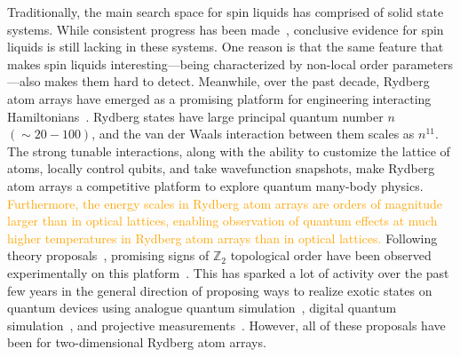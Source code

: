 \documentclass[twocolumn,superscriptaddress,amsmath,amssymb,aps,prx,nofootinbib]{revtex4-2}
\newcommand{\addtext}[1]{\textcolor{orange}{#1}}
\begin{document}
Traditionally, the main search space for spin liquids has comprised of solid state systems. While consistent progress has been made~\cite{savary2017,knolle2019field}, conclusive evidence for spin liquids is still lacking in these systems. One reason is that the same feature that makes spin liquids interesting---being characterized by non-local order parameters---also makes them hard to detect. Meanwhile, over the past decade, Rydberg atom arrays have emerged as a promising platform for engineering interacting Hamiltonians~\cite{weimer2010rydberg,ebadi2021quantum,wu2021concise,saffman2010,lukin2001,labuhn2016,jaksch2000,browaeys2016,barredo2016anatom,beguin2013,barredo2018,semeghini2021, bernien2017probing,bluvstein2022quantum,guardado-sanchez2018probing,keesling2019quantum,levine2019parallel,lienhard2018observing,madjarov2020highfidelity,omran2019generation,schauss2015crystallization,song2021quantum}. Rydberg states have large principal quantum number $n$ $(\sim 20-100)$, and the van der Waals interaction between them scales as $n^{11}$. The strong tunable interactions, along with the ability to customize the lattice of atoms, locally control qubits, and take wavefunction snapshots, make Rydberg atom arrays a competitive platform to explore quantum many-body physics. 
\addtext{Furthermore, the energy scales in Rydberg atom arrays are orders of magnitude larger than in optical lattices, enabling observation of quantum effects at much higher temperatures in Rydberg atom arrays than in optical lattices.}
Following theory proposals~\cite{verresen2021,samajdar2021}, promising signs of $\mathbb{Z}_2$ topological order have been observed experimentally on this platform~\cite{semeghini2021}. This has sparked a lot of activity over the past few years in the general direction of proposing ways to realize exotic states on quantum devices using analogue quantum simulation~\cite{myerson2022construction,slagle2022quantum, giudice2022trimer,zhou2022quantum, tarabunga2023classification, kornjaca2023trimer,ohler2023quantum}, digital quantum simulation~\cite{liu2021methods}, and projective measurements~\cite{tantivasadakarn2022shortest,verresen2021efficiently}. However, all of these proposals have been for two-dimensional Rydberg atom arrays.
\end{document}
